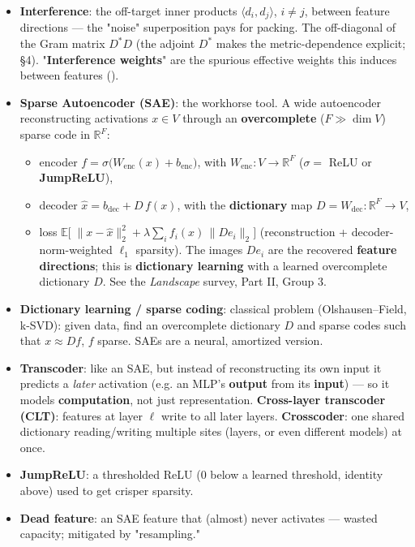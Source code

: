 \begin{itemize}
\item \textbf{Interference}: the off-target inner products $\langle d_i, d_j\rangle$, $i\ne j$, between feature directions --- the "noise" superposition pays for packing. The off-diagonal of the Gram matrix $D^{*}D$ (the adjoint $D^{*}$ makes the metric-dependence explicit; §4). "\textbf{Interference weights}" are the spurious effective weights this induces between features (\textcite{toy-model-of-interference-weights}).
\item \textbf{Sparse Autoencoder (SAE)}: the workhorse tool. A wide autoencoder reconstructing activations $x\in V$ through an \textbf{overcomplete} ($F \gg \dim V$) sparse code in $\mathbb{R}^F$:
\begin{itemize}
\item encoder $f = \sigma\big(W_{\text{enc}}(x) + b_{\text{enc}}\big)$, with $W_{\text{enc}} : V \to \mathbb{R}^F$ ($\sigma=$ ReLU or \textbf{JumpReLU}),
\item decoder $\hat x = b_{\text{dec}} + D\,f(x)$, with the \textbf{dictionary} map $D = W_{\text{dec}} : \mathbb{R}^F \to V$,
\item loss $\mathbb{E}\big[\;\|x-\hat x\|_2^2 + \lambda \sum_i f_i(x)\,\|D e_i\|_2 \big]$ (reconstruction + decoder-norm-weighted $\ell_1$ sparsity). The images $D e_i$ are the recovered \textbf{feature directions}; this is \textbf{dictionary learning} with a learned overcomplete dictionary $D$. See the \emph{Landscape} survey, Part II, Group 3.
\end{itemize}
\item \textbf{Dictionary learning / sparse coding}: classical problem (Olshausen--Field, k-SVD): given data, find an overcomplete dictionary $D$ and sparse codes such that $x \approx D f$, $f$ sparse. SAEs are a neural, amortized version.
\item \textbf{Transcoder}: like an SAE, but instead of reconstructing its own input it predicts a \emph{later} activation (e.g. an MLP's \textbf{output} from its \textbf{input}) --- so it models \textbf{computation}, not just representation. \textbf{Cross-layer transcoder (CLT)}: features at layer $\ell$ write to all later layers. \textbf{Crosscoder}: one shared dictionary reading/writing multiple sites (layers, or even different models) at once.
\item \textbf{JumpReLU}: a thresholded ReLU ($0$ below a learned threshold, identity above) used to get crisper sparsity.
\item \textbf{Dead feature}: an SAE feature that (almost) never activates --- wasted capacity; mitigated by "resampling."

\end{itemize}
